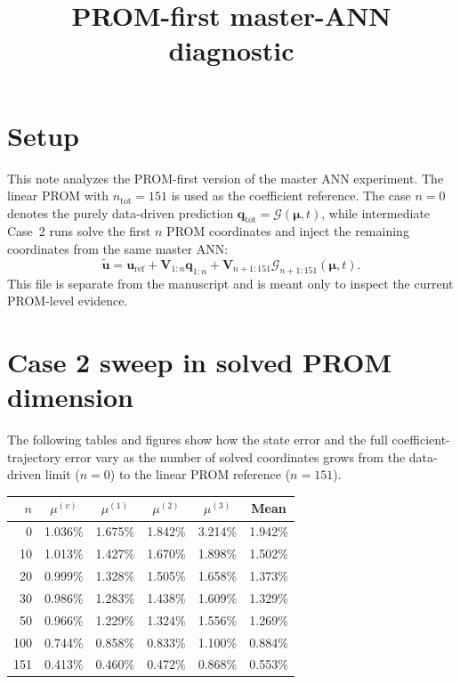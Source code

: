\documentclass[11pt]{article}
\title{PROM-first master-ANN diagnostic}
\date{}
\begin{document}
\maketitle

\section*{Setup}
This note analyzes the PROM-first version of the master ANN experiment.  The
linear PROM with $n_{\mathrm{tot}}=151$ is used as the coefficient reference.
The case $n=0$ denotes the purely data-driven prediction
$\mathbf q_{\mathrm{tot}}=\mathcal G(\bm\mu,t)$, while intermediate Case~2
runs solve the first $n$ PROM coordinates and inject the remaining
coordinates from the same master ANN:
\[
\widetilde{\mathbf u}
=
\mathbf u_{\mathrm{ref}}
+\mathbf V_{1:n}\mathbf q_{1:n}
+\mathbf V_{n+1:151}\mathcal G_{n+1:151}(\bm\mu,t).
\]
This file is separate from the manuscript and is meant only to inspect the
current PROM-level evidence.

\section*{Case 2 sweep in solved PROM dimension}
The following tables and figures show how the state error and the full
coefficient-trajectory error vary as the number of solved coordinates grows
from the data-driven limit ($n=0$) to the linear PROM reference ($n=151$).

\begin{center}
\small
\begin{tabular}{rccccc}
\toprule
$n$ & $\mu^{(v)}$ & $\mu^{(1)}$ & $\mu^{(2)}$ & $\mu^{(3)}$ & Mean \\
\midrule
0 & 1.036\% & 1.675\% & 1.842\% & 3.214\% & 1.942\% \\
10 & 1.013\% & 1.427\% & 1.670\% & 1.898\% & 1.502\% \\
20 & 0.999\% & 1.328\% & 1.505\% & 1.658\% & 1.373\% \\
30 & 0.986\% & 1.283\% & 1.438\% & 1.609\% & 1.329\% \\
50 & 0.966\% & 1.229\% & 1.324\% & 1.556\% & 1.269\% \\
100 & 0.744\% & 0.858\% & 0.833\% & 1.100\% & 0.884\% \\
151 & 0.413\% & 0.460\% & 0.472\% & 0.868\% & 0.553\% \\
\bottomrule
\end{tabular}
\end{center}
\end{document}
